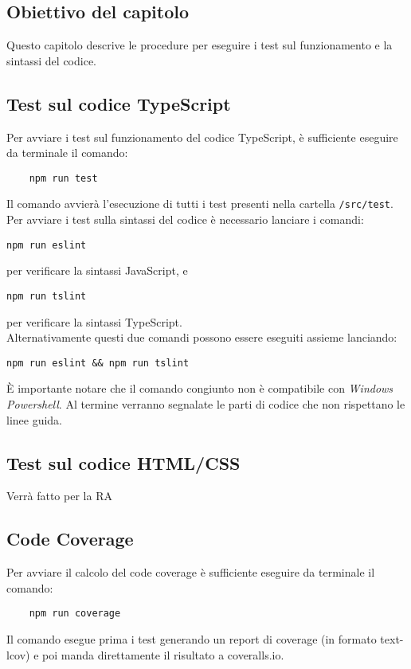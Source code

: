 \subsection{Obiettivo del capitolo}
Questo capitolo descrive le procedure per eseguire i test sul funzionamento e la sintassi del codice.
\subsection{Test sul codice TypeScript}
Per avviare i test sul funzionamento del codice TypeScript, è sufficiente eseguire da terminale il comando:
\begin{verbatim}
	npm run test
\end{verbatim}
Il comando avvierà l'esecuzione di tutti i test presenti nella cartella \texttt{/src/test}.
Per avviare i test sulla sintassi del codice è necessario lanciare i comandi:
\begin{verbatim}
npm run eslint
\end{verbatim}
per verificare la sintassi JavaScript, e
\begin{verbatim}
npm run tslint
\end{verbatim}
per verificare la sintassi TypeScript.\\
Alternativamente questi due comandi possono essere eseguiti assieme lanciando:
\begin{verbatim}
npm run eslint && npm run tslint
\end{verbatim}
È importante notare che il comando congiunto non è compatibile con \emph{Windows Powershell}.
Al termine verranno segnalate le parti di codice che non rispettano le linee guida.

\subsection{Test sul codice HTML/CSS}
Verrà fatto per la RA
\subsection{Code Coverage}
Per avviare il calcolo del code coverage è sufficiente eseguire da terminale il comando:
\begin{verbatim}
	npm run coverage
\end{verbatim}
Il comando esegue prima i test generando un report di coverage (in formato text-lcov) e poi manda direttamente il risultato a coveralls.io.